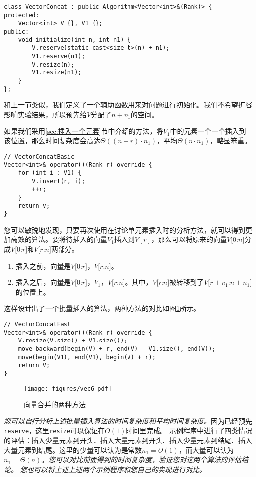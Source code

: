 \begin{lstlisting}
class VectorConcat : public Algorithm<Vector<int>&(Rank)> {
protected:
    Vector<int> V {}, V1 {};
public:
    void initialize(int n, int n1) {
        V.reserve(static_cast<size_t>(n) + n1);
        V1.reserve(n1);
        V.resize(n);
        V1.resize(n1);
    }
};
\end{lstlisting}

和上一节类似，我们定义了一个辅助函数用来对问题进行初始化。我们不希望扩容影响实验结果，所以预先给$V$分配了$n+n_1$的空间。

如果我们采用\ref{sec:插入一个元素}节中介绍的方法，将$V_1$中的元素一个一个插入到该位置，那么时间复杂度会高达$\Theta((n-r)\cdot n_1)$，平均$\Theta(n\cdot n_1)$，略显笨重。

\begin{lstlisting}
// VectorConcatBasic
Vector<int>& operator()(Rank r) override {
    for (int i : V1) {
        V.insert(r, i);
        ++r;
    }
    return V;
}
\end{lstlisting}

您可以敏锐地发现，只要再次使用在讨论单元素插入时的分析方法，就可以得到更加高效的算法。要将待插入的向量$V_1$插入到$V[r]$，那么可以将原来的向量$V[0$:$n]$分成$V[0$:$r]$和$V[r$:$n]$两部分。
\begin{enumerate}
    \item 插入之前，向量是$V[0$:$r]$，$V[r$:$n]$。
    \item 插入之后，向量是$V[0$:$r]$，$V_1$，$V[r$:$n]$。其中，$V[r$:$n]$被转移到了$V[r+n_1$:$n+n_1]$的位置上。
\end{enumerate}

这样设计出了一个批量插入的算法，两种方法的对比如图\ref{fig:vec6}所示。


\begin{lstlisting}
// VectorConcatFast
Vector<int>& operator()(Rank r) override {
    V.resize(V.size() + V1.size());
    move_backward(begin(V) + r, end(V) - V1.size(), end(V));
    move(begin(V1), end(V1), begin(V) + r);
    return V;
}
\end{lstlisting}


\begin{figure}
  \centering
  \texttt{[image: figures/vec6.pdf]}
  \caption{向量合并的两种方法}
  \label{fig:vec6}
\end{figure}

\textit{您可以自行分析上述批量插入算法的时间复杂度和平均时间复杂度。}因为已经预先\lstinline{reserve}，这里\lstinline{resize}可以保证在$O(1)$时间里完成。
示例程序中进行了四类情况的评估：插入少量元素到开头、插入大量元素到开头、插入少量元素到结尾、插入大量元素到结尾。这里的少量可以认为是常数$n_1 = O(1)$，而大量可以认为$n_1 = \Theta(n)$。\textit{您可以对比前面得到的时间复杂度，验证您对这两个算法的评估结论。}
\textit{您也可以将上述上述两个示例程序和您自己的实现进行对比。}

